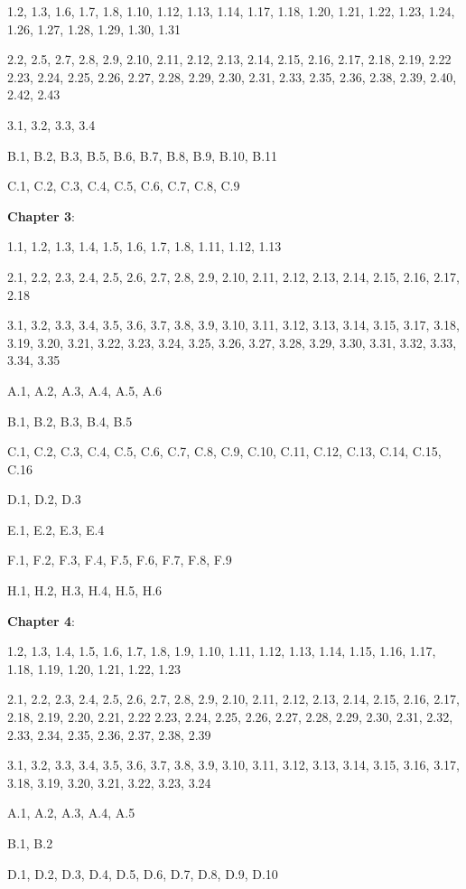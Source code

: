 \documentclass{article}
\begin{document}
1.2, 1.3, 1.6, 1.7, 1.8, 1.10, 1.12, 1.13, 1.14, 1.17, 1.18, 1.20, 1.21, 1.22, 1.23, 1.24, 1.26, 1.27, 1.28, 1.29, 1.30, 1.31

2.2, 2.5, 2.7, 2.8, 2.9, 2.10, 2.11, 2.12, 2.13, 2.14, 2.15, 2.16, 2.17, 2.18, 2.19, 2.22 2.23, 2.24, 2.25, 2.26, 2.27, 2.28, 2.29, 2.30, 2.31, 2.33, 2.35, 2.36, 2.38, 2.39, 2.40, 2.42, 2.43

3.1, 3.2, 3.3, 3.4

B.1, B.2, B.3, B.5, B.6, B.7, B.8, B.9, B.10, B.11

C.1, C.2, C.3, C.4, C.5, C.6, C.7, C.8, C.9
\medskip

\textbf{Chapter 3}:
\medskip

1.1, 1.2, 1.3, 1.4, 1.5, 1.6, 1.7, 1.8, 1.11, 1.12, 1.13

2.1, 2.2, 2.3, 2.4, 2.5, 2.6, 2.7, 2.8, 2.9, 2.10, 2.11, 2.12, 2.13, 2.14, 2.15, 2.16, 2.17, 2.18

3.1, 3.2, 3.3, 3.4, 3.5, 3.6, 3.7, 3.8, 3.9, 3.10, 3.11, 3.12, 3.13, 3.14, 3.15, 3.17, 3.18, 3.19, 3.20, 3.21, 3.22, 3.23, 3.24, 3.25, 3.26, 3.27, 3.28, 3.29, 3.30, 3.31, 3.32, 3.33, 3.34, 3.35

A.1, A.2, A.3, A.4, A.5, A.6

B.1, B.2, B.3, B.4, B.5

C.1, C.2, C.3, C.4, C.5, C.6, C.7, C.8, C.9, C.10, C.11, C.12, C.13, C.14, C.15, C.16

D.1, D.2, D.3

E.1, E.2, E.3, E.4

F.1, F.2, F.3, F.4, F.5, F.6, F.7, F.8, F.9

H.1, H.2, H.3, H.4, H.5, H.6
\medskip

\textbf{Chapter 4}:
\medskip

1.2, 1.3, 1.4, 1.5, 1.6, 1.7, 1.8, 1.9, 1.10, 1.11, 1.12, 1.13, 1.14, 1.15, 1.16, 1.17, 1.18, 1.19, 1.20, 1.21, 1.22, 1.23

2.1, 2.2, 2.3, 2.4, 2.5, 2.6, 2.7, 2.8, 2.9, 2.10, 2.11, 2.12, 2.13, 2.14, 2.15, 2.16, 2.17, 2.18, 2.19, 2.20, 2.21, 2.22 2.23, 2.24, 2.25, 2.26, 2.27, 2.28, 2.29, 2.30, 2.31, 2.32, 2.33, 2.34, 2.35, 2.36, 2.37, 2.38, 2.39

3.1, 3.2, 3.3, 3.4, 3.5, 3.6, 3.7, 3.8, 3.9, 3.10, 3.11, 3.12, 3.13, 3.14, 3.15, 3.16, 3.17, 3.18, 3.19, 3.20, 3.21, 3.22, 3.23, 3.24

A.1, A.2, A.3, A.4, A.5

B.1, B.2

D.1, D.2, D.3, D.4, D.5, D.6, D.7, D.8, D.9, D.10
\end{document}
